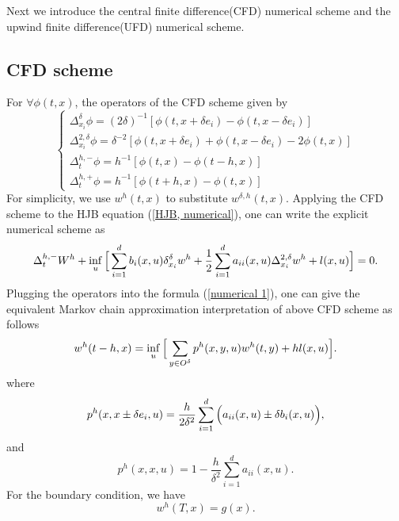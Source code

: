 \documentclass{article}
\begin{document}
Next we introduce the central finite difference(CFD) numerical scheme and the upwind finite difference(UFD) numerical scheme.

\subsection{CFD scheme} 

For $\forall \phi(t, x)$, the operators of the CFD scheme given by
\begin{equation*}
    \begin{cases}
    \Delta_{x_{i}}^{\delta} \phi = (2 \delta)^{-1}[\phi(t, x + \delta e_{i}) - \phi(t, x -  \delta e_{i})] \\
    \Delta_{x_{i}}^{2, \delta} \phi = \delta^{-2}[\phi(t, x + \delta e_{i}) + \phi(t, x -  \delta e_{i}) - 2 \phi(t, x)] \\
    \Delta_{t}^{h, -}\phi = h^{-1} [\phi(t, x) - \phi(t-h, x)] \\
    \Delta_{t}^{h, +}\phi = h^{-1} [\phi(t+h, x) - \phi(t, x)]
    \end{cases}
\end{equation*}
For simplicity, we use $w^{h}(t, x)$ to substitute $w^{\delta, h}(t, x)$. Applying the CFD scheme to the HJB equation (\ref{HJB, numerical}), one can write the explicit numerical scheme as
\begin{equation} \label{numerical 1}
\Delta_{t}^{h, -} W^{h} + \inf_{u} \Big{[} \sum_{i = 1}^{d} b_{i} (x, u) \delta_{x_{i}}^{\delta} w^{h} + \frac{1}{2} \sum_{i = 1}^{d} a_{ii} (x, u) \Delta_{x_{i}}^{2, \delta} w^{h} + l(x, u) \Big{]} = 0.
\end{equation}
Plugging the operators into the formula (\ref{numerical 1}), one can give the equivalent Markov chain approximation interpretation of above CFD scheme as follows
\begin{equation}
    w^{h} (t - h, x) = \inf_{u} \Big{[} \sum_{y \in O^{\delta}} p^{h}(x, y, u) w^{h}(t, y) + h l(x, u) \Big{]}.
\end{equation}
where
\begin{equation*}
    p^{h}(x, x \pm \delta e_{i}, u) = \frac{h}{2 \delta^{2}} \sum_{i = 1}^{d} \Big{(} a_{ii}(x, u) \pm \delta b_{i}(x, u) \Big{)},
\end{equation*}
and 
\begin{equation*}
    p^{h}(x, x, u) = 1 - \frac{h}{\delta^{2}} \sum_{i = 1}^{d} a_{ii} (x, u).
\end{equation*}
For the boundary condition, we have
\begin{equation*}
w^{h} (T, x) = g(x).
\end{equation*}
\end{document}
